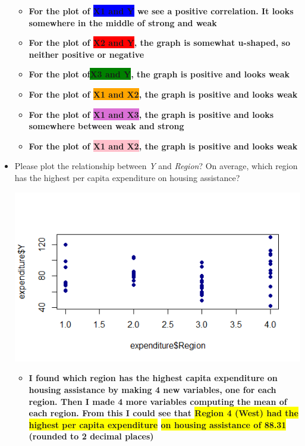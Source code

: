 \documentclass[12pt,letterpaper]{article}
\begin{document}
\begin{itemize}
\begin{itemize}
	\item \textbf{For the plot of \colorbox{blue}{X1 and Y} we see a positive correlation. It looks somewhere in the middle of strong and weak}
	
	\item \textbf{For the plot of \colorbox{red}{X2 and Y}, the graph is somewhat u-shaped, so neither positive or negative}
	
	\item \textbf{For the plot of\colorbox{green}{X3 and Y}, the graph is positive and looks weak}
	
	\item \textbf{For the plot of \colorbox{orange}{X1 and X2}, the graph is positive and looks weak}
	
	
	
	\item \textbf{For the plot of \colorbox{Orchid}{X1 and X3}, the graph is positive and looks somewhere between weak and strong}
	
	\item \textbf{For the plot of \colorbox{pink}{X1 and X2}, the graph is positive and looks weak}
\end{itemize}
	

\vspace{.5cm}
\item
Please plot the relationship between \emph{Y} and \emph{Region}? On average, which region has the highest per capita expenditure on housing assistance?
\vspace{0cm}


 \includegraphics[width=.8\textwidth]{Y_Region}\hfill
		
	\begin{itemize}
		\item \textbf{I found which region has the highest capita expenditure on housing assistance by making 4 new variables, one for each region. Then I made 4 more variables computing the mean of each region. From this I could see that \colorbox{yellow}{Region 4 (West) had the highest per capita expenditure} \newline \colorbox{yellow}{on housing assistance of 88.31} (rounded to 2 decimal places)}
		

\end{itemize}
\end{itemize}
\end{document}
